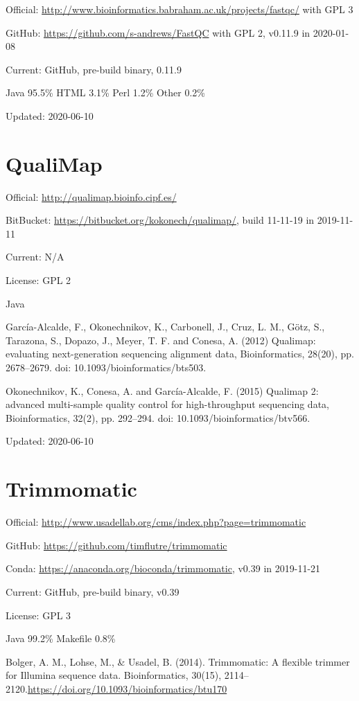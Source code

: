 \documentclass[]{article}
\begin{document}
Official: \url{http://www.bioinformatics.babraham.ac.uk/projects/fastqc/} with GPL 3

GitHub: \url{https://github.com/s-andrews/FastQC} with GPL 2, v0.11.9 in 2020-01-08

Current: GitHub, pre-build binary, 0.11.9

Java 95.5\% HTML 3.1\% Perl 1.2\% Other 0.2\%

Updated: 2020-06-10

\section{QualiMap}

Official: \url{http://qualimap.bioinfo.cipf.es/}

BitBucket: \url{https://bitbucket.org/kokonech/qualimap/}, build 11-11-19 in 2019-11-11

Current: N/A

License: GPL 2

Java

García-Alcalde, F., Okonechnikov, K., Carbonell, J., Cruz, L. M., Götz, S., Tarazona, S., Dopazo, J., Meyer, T. F. and Conesa, A. (2012) Qualimap: evaluating next-generation sequencing alignment data, Bioinformatics, 28(20), pp. 2678–2679. doi: 10.1093/bioinformatics/bts503.

Okonechnikov, K., Conesa, A. and García-Alcalde, F. (2015) Qualimap 2: advanced multi-sample quality control for high-throughput sequencing data, Bioinformatics, 32(2), pp. 292–294. doi: 10.1093/bioinformatics/btv566.

Updated: 2020-06-10

\section{Trimmomatic}

Official: \url{http://www.usadellab.org/cms/index.php?page=trimmomatic}

GitHub: \url{https://github.com/timflutre/trimmomatic}

Conda: \url{https://anaconda.org/bioconda/trimmomatic}, v0.39 in 2019-11-21

Current: GitHub, pre-build binary, v0.39

License: GPL 3

Java 99.2\% Makefile 0.8\%

Bolger, A. M., Lohse, M., \& Usadel, B. (2014). Trimmomatic: A flexible trimmer for Illumina sequence data. Bioinformatics, 30(15), 2114–2120.\url{https://doi.org/10.1093/bioinformatics/btu170}
\end{document}
